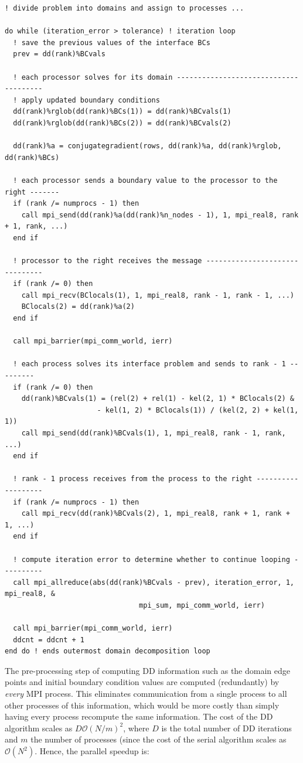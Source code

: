 \documentclass[10pt]{article}
\begin{document}
\begin{lstlisting}
! divide problem into domains and assign to processes ...

do while (iteration_error > tolerance) ! iteration loop 
  ! save the previous values of the interface BCs
  prev = dd(rank)%BCvals

  ! each processor solves for its domain --------------------------------------
  ! apply updated boundary conditions
  dd(rank)%rglob(dd(rank)%BCs(1)) = dd(rank)%BCvals(1)
  dd(rank)%rglob(dd(rank)%BCs(2)) = dd(rank)%BCvals(2)

  dd(rank)%a = conjugategradient(rows, dd(rank)%a, dd(rank)%rglob, dd(rank)%BCs)

  ! each processor sends a boundary value to the processor to the right -------
  if (rank /= numprocs - 1) then
    call mpi_send(dd(rank)%a(dd(rank)%n_nodes - 1), 1, mpi_real8, rank + 1, rank, ...)
  end if

  ! processor to the right receives the message -------------------------------
  if (rank /= 0) then
    call mpi_recv(BClocals(1), 1, mpi_real8, rank - 1, rank - 1, ...)
    BClocals(2) = dd(rank)%a(2)
  end if

  call mpi_barrier(mpi_comm_world, ierr)

  ! each process solves its interface problem and sends to rank - 1 ---------
  if (rank /= 0) then
    dd(rank)%BCvals(1) = (rel(2) + rel(1) - kel(2, 1) * BClocals(2) &
                      - kel(1, 2) * BClocals(1)) / (kel(2, 2) + kel(1, 1))
    call mpi_send(dd(rank)%BCvals(1), 1, mpi_real8, rank - 1, rank, ...)
  end if

  ! rank - 1 process receives from the process to the right -------------------
  if (rank /= numprocs - 1) then
    call mpi_recv(dd(rank)%BCvals(2), 1, mpi_real8, rank + 1, rank + 1, ...)
  end if

  ! compute iteration error to determine whether to continue looping ----------
  call mpi_allreduce(abs(dd(rank)%BCvals - prev), iteration_error, 1, mpi_real8, &
                                mpi_sum, mpi_comm_world, ierr)

  call mpi_barrier(mpi_comm_world, ierr)
  ddcnt = ddcnt + 1
end do ! ends outermost domain decomposition loop
\end{lstlisting}

The pre-processing step of computing DD information such as the domain edge points and initial boundary condition values are computed (redundantly) by {\it every} MPI process. This eliminates communication from a single process to all other processes of this information, which would be more costly than simply having every process recompute the same information. The cost of the DD algorithm scales as \(D\mathscr{O}(N/m)^2\), where \(D\) is the total number of DD iterations and \(m\) the number of processes (since the cost of the serial algorithm scales as \(\mathscr{O}(N^2)\). Hence, the parallel speedup is:
\end{document}
